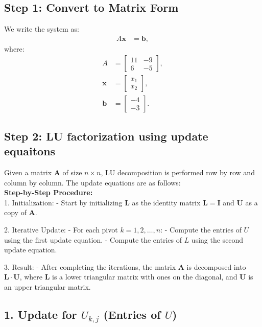 \documentclass[journal]{IEEEtran}
\begin{document}
	\subsection*{Step 1: Convert to Matrix Form}
	We write the system as:
	\begin{align}
		A \mathbf{x} &= \mathbf{b},
	\end{align}
	where:
	\begin{align}
		A &= \begin{bmatrix} 11 & -9 \\ 6 & -5 \end{bmatrix}, \\
		\mathbf{x} &= \begin{bmatrix} x_1 \\ x_2 \end{bmatrix}, \\
		\mathbf{b} &= \begin{bmatrix} -4 \\ -3 \end{bmatrix}.
	\end{align}
	
	\subsection*{Step 2: LU factorization using update equaitons}
    Given a matrix $ \mathbf{A} $ of size $ n \times n $, LU decomposition is performed row by row and column by column. The update equations are as follows:\\
    \textbf{Step-by-Step Procedure:}\\
1. Initialization: 
   - Start by initializing $ \mathbf{L} $ as the identity matrix $ \mathbf{L} = \mathbf{I} $ and $ \mathbf{U} $ as a copy of $ \mathbf{A} $.
   
2. Iterative Update:
   - For each pivot $ k = 1, 2, \ldots, n $:
     - Compute the entries of $ U $ using the first update equation.
     - Compute the entries of $ L $ using the second update equation.
   
3. Result:
   - After completing the iterations, the matrix $ \mathbf{A} $ is decomposed into $ \mathbf{L} \cdot \mathbf{U} $, where $ \mathbf{L} $ is a lower triangular matrix with ones on the diagonal, and $ \mathbf{U} $ is an upper triangular matrix.

    

\subsection*{1. Update for $ U_{k,j} $ (Entries of $ U $)}
\end{document}
